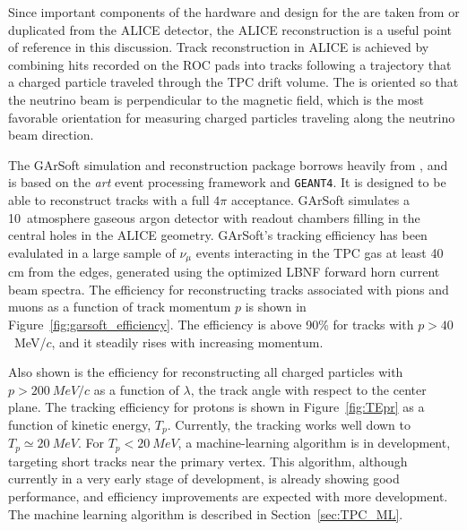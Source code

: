 %

Since important components of the hardware and design for the  are taken from or duplicated from the ALICE detector, the ALICE reconstruction is a useful point of reference in this discussion.
Track reconstruction in ALICE is achieved by combining hits recorded on the ROC pads into tracks following a trajectory that a charged particle traveled through the TPC drift volume.  The  is oriented so that the neutrino beam is perpendicular to the magnetic field, which is the most favorable orientation for measuring charged particles traveling along the neutrino beam direction.   

The GArSoft simulation and reconstruction package borrows heavily from  , and is based on the {\it art} event processing framework and {\tt GEANT4}.  It is designed to be able to reconstruct tracks with a full $4\pi$ acceptance.   GArSoft simulates a 10~atmosphere gaseous argon detector with readout chambers filling in the central holes in the ALICE geometry.  GArSoft's tracking efficiency has been evalulated in a large sample of  $\nu_\mu$ events interacting in the TPC gas at least 40 cm from the edges, generated using the optimized LBNF forward horn current beam spectra. The efficiency
for reconstructing tracks associated with pions and muons as a function of track momentum $p$ is shown in  Figure~\ref{fig:garsoft_efficiency}.  The efficiency is above 90\% for tracks with $p>40$~MeV/$c$, and it steadily rises with increasing momentum.  

Also shown is the efficiency for reconstructing all charged particles with $p>\SI{200}{MeV/c}$ as a function of $\lambda$,  the track angle with respect to the center plane.  The tracking efficiency for protons is shown in Figure~\ref{fig:TEpr} as a function of kinetic energy, $T_p$.  Currently, the tracking works well down to $T_p \simeq \SI{20}{MeV}$. For $T_p < \SI{20}{MeV}$, a machine-learning algorithm is in development, targeting short tracks near the primary vertex. This algorithm, although currently in a very early stage of development, is already showing good performance, and efficiency improvements are expected with more development. The machine learning algorithm is described in Section~\ref{sec:TPC_ML}.

